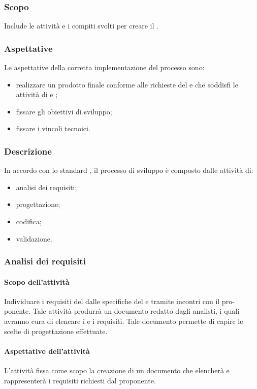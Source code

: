 \subsubsection{Scopo}
Include le attività e i compiti svolti per creare il .
\subsubsection{Aspettative}
Le aspettative della corretta implementazione del processo sono:
\begin{itemize}
		\item realizzare un prodotto finale conforme alle richieste del  e che soddisfi le attività di  e ;
		\item fissare gli obiettivi di sviluppo;
		\item fissare i vincoli tecnoici.
\end{itemize}

\subsubsection{Descrizione}
In accordo con lo standard , il processo di sviluppo è composto dalle attività di:
\begin{itemize}
		\item analisi dei requisiti;
		\item progettazione;
		\item codifica;
		\item validazione.
\end{itemize}

\subsubsection{Analisi dei requisiti}
 \paragraph{Scopo dell'attività}
  Individuare i requisiti del  dalle specifiche del  e tramite incontri con il pro-
  ponente. Tale attività produrrà un documento redatto dagli analisti, i quali avranno cura di elencare i  e i requisiti. Tale documento permette di
 capire le scelte di progettazione effettuate.
 \paragraph{Aspettative dell'attività}
 L'attività fissa come scopo la creazione di un documento che elencherà e rappresenterà i requisiti richiesti dal proponente.
